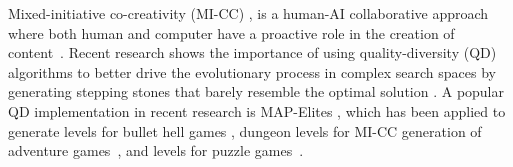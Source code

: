 Mixed-initiative co-creativity (MI-CC) , is a human-AI collaborative approach where both human and computer have a proactive role in the creation of content~. %
Recent research shows the importance of using quality-diversity (QD) algorithms  to better drive the evolutionary process in complex search spaces by generating stepping stones that barely resemble the optimal solution . A popular QD implementation in recent research is MAP-Elites , which has been applied to generate levels for bullet hell games , dungeon levels for MI-CC generation of adventure games~, and levels for puzzle games~.%


